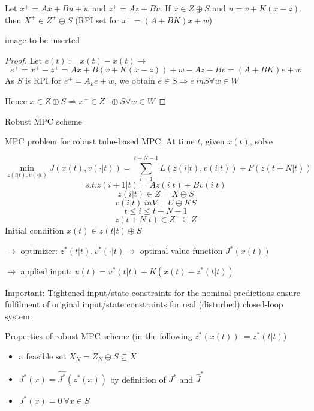 Let $x^+ = Ax + Bu + w$ and $z^+ = Az + Bv$. If $ x \in Z \oplus S$ and $ u = v + K(x - z)$, then $ X^+ \in Z^+ \oplus S$ (RPI set for $x^+ = (A+BK)x + w$)

image to be inserted

\begin{proof}

Let $e(t) := x(t) - x(t) \rightarrow$
\begin{equation*}
e^+ = x^+ - z^+ = Ax + B(v + K(x-z)) + w - Az - Bv = (A+BK)e + w
\end{equation*}
As $S$ is RPI for $e^+ = A_ke + w$, we obtain $e \in S \Rightarrow e \ in S \forall w \in W$

Hence $x \in Z \oplus S \Rightarrow x^+ \in Z^+ \oplus S \forall w \in W$

\end{proof}

Robust MPC scheme 

MPC problem for robust tube-based MPC: At time $t$, given $x(t)$, solve 

\begin{equation*}
\min_{z(t|t), v(\cdot|t)} J(x(t),v(\cdot|t)) = \sum_{i = 1}^{t+ N -1}L(z(i|t), v(i|t)) + F(z(t+N|t))
\end{equation*}
\begin{equation*}
s.t. z(i+1|t) = Az(i|t) + Bv(i|t)
\end{equation*}  
\begin{equation*}
z(i|t) \in Z = X \ominus S 
\end{equation*}
\begin{equation*}
v(i|t) \ in V = U \ominus KS
\end{equation*}
\begin{equation*}
t \leq i \leq t + N -1
\end{equation*}
\begin{equation*}
z(t+N|t) \in Z^+ \subseteq Z 
\end{equation*}
Initial condition $x(t) \in z(t|t) \oplus S$

$\rightarrow$ optimizer: $z^*(t|t), v^*(\cdot|t) \rightarrow$ optimal value function $J^*(x(t))$

$\rightarrow$ applied input: $u(t) = v^*(t|t) + K(x(t) - z^*(t|t))$

Important: Tightened input/state constraints for the nominal predictions ensure fulfilment of original input/state constraints for real (disturbed) closed-loop system.

Properties of robust MPC scheme (in the following $z^*(x(t)):=z^*(t|t)$)
\begin{itemize}
\item a feasible set $X_N = Z_N \oplus S \subseteq X$
\item $J^*(x) = \hat{J^*}(z^*(x))$ by definition of $J^*$ and $\hat J^*$
\item $J^*(x) = 0 \ \forall x \in S$
\end{itemize}    

